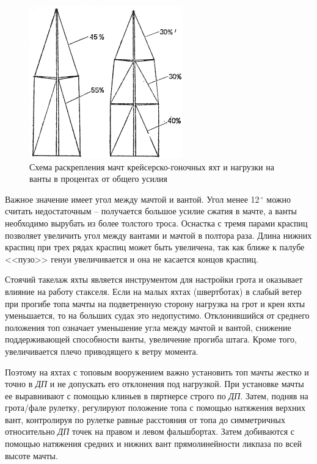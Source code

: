\documentclass[a4paper, 12pt, twoside, final, book, russian, fittopage, cyremdash]{ncc}
\newcommand{\gr}{\ensuremath{\,^\circ}\xspace}
\begin{document}
\begin{figure}[htb]
  \centering{}
  \includegraphics[scale=1.2]{0040P}
  \caption{Схема раскрепления мачт крейсерско-гоночных яхт и нагрузки на ванты в процентах от общего усилия}
  \label{fig:40}
\end{figure}

Важное значение имеет угол между мачтой и вантой. Угол менее 12\gr можно считать недостаточным \--- получается большое усилие сжатия в мачте, а ванты необходимо вырубать из более толстого троса. Оснастка с тремя парами краспиц позволяет увеличить угол между вантами и мачтой в полтора раза. Длина нижних краспиц при трех рядах краспиц может быть увеличена, так как ближе к палубе <<пузо>> генуи увеличивается и она не касается концов краспиц. 

Стоячий такелаж яхты является инструментом для настройки грота и оказывает влияние на работу стакселя. Если на малых яхтах (швертботах) в слабый ветер при прогибе топа мачты на подветренную сторону нагрузка на грот и крен яхты уменьшается, то на больших судах это недопустимо. Отклонившийся от среднего положения топ означает уменьшение угла между мачтой и вантой, снижение поддерживающей способности ванты, увеличение прогиба штага. Кроме того, увеличивается плечо приводящего к ветру момента. 

Поэтому на яхтах с топовым вооружением важно установить топ мачты жестко и точно в \textit{ДП} и не допускать его отклонения под нагрузкой. При установке мачты ее выравнивают с помощью клиньев в пяртнерсе строго по \textit{ДП}. Затем, подняв на грота\-/фале рулетку, регулируют положение топа с помощью натяжения верхних вант, контролируя по рулетке равные расстояния от топа до симметричных относительно \textit{ДП} точек на правом и левом фальшбортах. Затем добиваются с помощью натяжения средних и нижних вант прямолинейности ликпаза по всей высоте мачты. 
\end{document}
